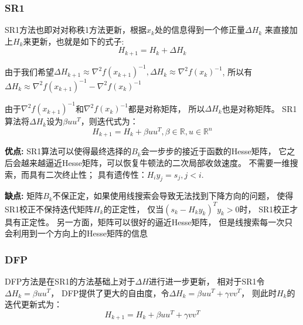             \subsubsection{SR1}\cite{1980Curvilinear}
                SR1方法也即对对称秩1方法更新，根据$x_k$处的信息得到一个修正量$\Delta H_k$
                来直接加上$H_k$来更新，也就是如下的式子:
                \begin{equation}
                    H_{k+1} = H_k + \Delta H_k
                \end{equation}
                
                由于我们希望$\Delta H_{k+1} \approx \nabla^2f(x_{k+1})^{-1},
                             \Delta H_{k} \approx \nabla^2f(x_k)^{-1}$,
                所以有$\Delta H_k \approx \nabla^2f(x_{k+1})^{-1}-\nabla^2f(x_k)^{-1}$
                
                由于$\nabla^2f(x_{k+1})^{-1}$和$\nabla^2f(x_k)^{-1}$都是对称矩阵，
                所以$\Delta H_k$也是对称矩阵。
                SR1算法将$\Delta H_k$设为$\beta uu^T$，则迭代式为：
                \begin{equation}
                    H_{k+1} = H_{k} + \beta uu^T, \beta\in \mathbb{R}, u \in \mathbb{R}^{n}
                \end{equation}
                
                \textbf{优点:}
                    SR1算法可以使得最终选择的$B_k$会一步步的接近于函数的Hesse矩阵，
                    它之后会越来越逼近Hesse矩阵，可以恢复牛顿法的二次局部收敛速度。
                    不需要一维搜索，而具有二次终止性；
                    具有遗传性：$H_iy_j=s_j,j<i.$
                
                \textbf{缺点:}
                    矩阵$B_k$不保正定，如果使用线搜索会导致无法找到下降方向的问题，
                    使得SR1校正不保持迭代矩阵$H_k$的正定性，
                    仅当$(s_k-H_ky_k)^Ty_k>0$时，
                    SR1校正才具有正定性。
                    另一方面，矩阵可以很好的逼近Hesse矩阵，
                    但是线搜索每一次只会利用到一个方向上的Hesse矩阵的信息
                    
            \subsubsection{DFP}\cite{1963A}
                DFP方法是在SR1的方法基础上对于$\Delta H$进行进一步更新，
                相对于SR1令$\Delta H_k = \beta uu^T$，
                DFP提供了更大的自由度，令$\Delta H_k = \beta uu^T + \gamma vv^T$，
                则此时$H_k$的迭代更新式为：
                \begin{equation}
                    H_{k+1} = H_{k} + \beta uu^T + \gamma vv^T
                \end{equation}
                
